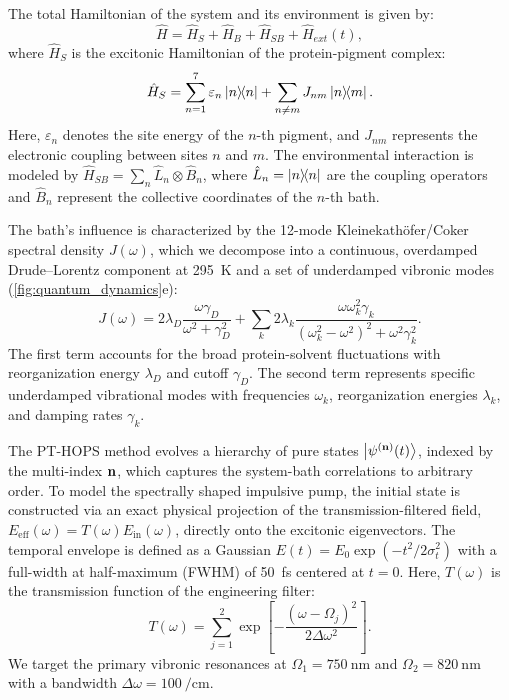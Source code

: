\documentclass[journal=jpcl,manuscript=letter]{achemso}
\begin{document}
The total Hamiltonian of the system and its environment is given by:
\begin{equation}
\hat{H} = \hat{H}_S + \hat{H}_B + \hat{H}_{SB} + \hat{H}_{ext}(t),
\label{eq:total_hamiltonian}
\end{equation}
where $\hat{H}_S$ is the excitonic Hamiltonian of the protein-pigment complex:
\begin{equation}
\hat{H}_S = \sum_{n=1}^{7} \varepsilon_n \dyad{n} + \sum_{n \neq m} J_{nm} \dyad{n}{m}.
\label{eq:excitonic_hamiltonian}
\end{equation}
Here, $\varepsilon_n$ denotes the site energy of the $n$-th pigment, and $J_{nm}$ represents the electronic coupling between sites $n$ and $m$. The environmental interaction is modeled by $\hat{H}_{SB} = \sum_n \hat{L}_n \otimes \hat{B}_n$, where $\hat{L}_n = \dyad{n}$ are the coupling operators and $\hat{B}_n$ represent the collective coordinates of the $n$-th bath.

The bath's influence is characterized by the 12-mode Kleinekathöfer/Coker spectral density $J(\omega)$, which we decompose into a continuous, overdamped Drude--Lorentz component at \SI{295}{\kelvin} and a set of underdamped vibronic modes (\cref{fig:quantum_dynamics}e):
\begin{equation}
J(\omega) = 2\lambda_D \frac{\omega \gamma_D}{\omega^2 + \gamma_D^2} + \sum_{k} 2\lambda_k \frac{\omega \omega_k^2 \gamma_k}{(\omega_k^2 - \omega^2)^2 + \omega^2 \gamma_k^2}.
\label{eq:spectral_density}
\end{equation}
The first term accounts for the broad protein-solvent fluctuations with reorganization energy $\lambda_D$ and cutoff $\gamma_D$. The second term represents specific underdamped vibrational modes with frequencies $\omega_k$, reorganization energies $\lambda_k$, and damping rates $\gamma_k$.

The PT-HOPS method evolves a hierarchy of pure states $\ket{\psi^{(\vb{n})}(t)}$, indexed by the multi-index $\vb{n}$, which captures the system-bath correlations to arbitrary order. To model the spectrally shaped impulsive pump, the initial state is constructed via an exact physical projection of the transmission-filtered field, $E_{\mathrm{eff}}(\omega) = T(\omega) E_{\mathrm{in}}(\omega)$, directly onto the excitonic eigenvectors. The temporal envelope is defined as a Gaussian $E(t) = E_0 \exp(-t^2/2\sigma_t^2)$ with a full-width at half-maximum (FWHM) of \SI{50}{\femto\second} centered at $t = 0$. Here, $T(\omega)$ is the transmission function of the engineering filter:
\begin{equation}
T(\omega) = \sum_{j=1}^2 \exp\left[ -\frac{(\omega - \Omega_{j})^2}{2\Delta\omega^2} \right].
\label{eq:transmission_function}
\end{equation}
We target the primary vibronic resonances at $\Omega_1 = \SI{750}{\nano\meter}$ and $\Omega_2 = \SI{820}{\nano\meter}$ with a bandwidth $\Delta\omega = \SI{100}{\per\centi\meter}$.
\end{document}
